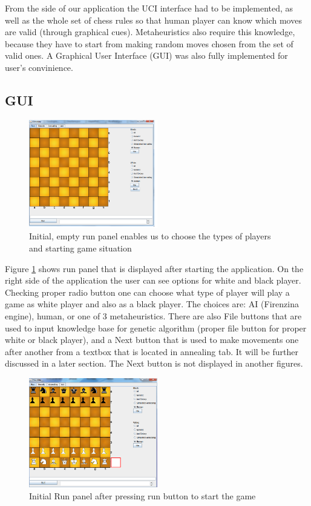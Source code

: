 \documentclass[pdftex]{article}
\begin{document}
From the side of our application the UCI interface had to be implemented, as well as the whole set of chess rules so that human player can know which moves are valid (through graphical cues). Metaheuristics also require this knowledge, because they have to start from making random moves chosen from the set of valid ones. A Graphical User Interface (GUI) was also fully implemented for user's convinience.

\subsection{GUI}
\label{sec:uci}

\begin{figure}[!htb]
	\centering
	\includegraphics[width=0.5\textwidth]{chessImages/Initial.png} 
	\caption{Initial, empty run panel enables us to choose the types of players and starting game situation}
	\label{fig:initialRunPanel}
\end{figure}

Figure \ref{fig:initialRunPanel} shows run panel that is displayed after starting the application. On the right side of the application the user can see options for white and black player. Checking proper radio button one can choose what type of player will play a game as white player and also as a black player. The choices are: AI (Firenzina engine), human, or one of 3 metaheuristics. There are also File buttons that are used to input knowledge base for genetic algorithm (proper file button for proper white or black player), and a Next button that is used to make movements one after another from a textbox that is located in annealing tab. It will be further discussed in a later section. The Next button is not displayed in another figures.

\begin{figure}[!htb]
	\centering
	\includegraphics[width=0.5\textwidth]{chessImages/InitialAfterRun.png} 
	\caption{Initial Run panel after pressing run button to start the game}
	\label{fig:initialRunPanelAfterRun}
\end{figure}
\end{document}
